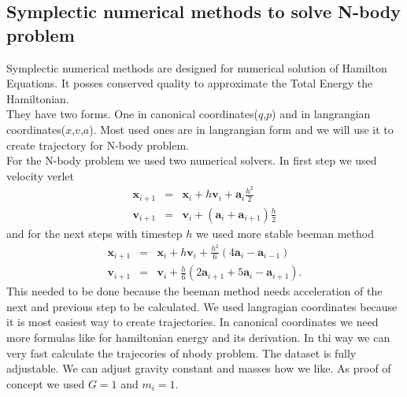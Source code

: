 \subsection{Symplectic numerical methods to solve N-body problem}
Symplectic numerical methods are designed for numerical solution of Hamilton Equations. It posses conserved quality to approximate the Total Energy the Hamiltonian.\\
They have two forms. One in canonical coordinates($q$,$p$) and in langrangian coordinates($x$,$v$,$a$). Most used ones are in langrangian form and we will use it to create trajectory for N-body problem.\\
For the N-body problem we used two numerical solvers. In first step we used velocity verlet
\begin{eqnarray}
	\mathbf{x}_{i+1} &=& \mathbf{x}_i + h\mathbf{v}_i + \mathbf{a}_i\frac{h^2}{2} \\
	\mathbf{v}_{i+1}&=&\mathbf{v}_i + (\mathbf{a}_i +\mathbf{a}_{i+1})\frac{h}{2}
\end{eqnarray} and
for the next steps with timestep $h$ we used more stable beeman method
\begin{eqnarray}
	\mathbf{x}_{i+1} &=& \mathbf{x}_i + h\mathbf{v}_i + \frac{h^2}{6}(4\mathbf{a}_{i}-\mathbf{a}_{i-1})\\
	\mathbf{v}_{i+1}&=&\mathbf{v}_i + \frac{h}{6}(2\mathbf{a}_{i+1} + 5\mathbf{a}_i-\mathbf{a}_{i+1}).
\end{eqnarray}
This needed to be done because the beeman method needs acceleration of the next and previous step to be calculated. We used langragian coordinates because it is most easiest way to create trajectories.
In canonical coordinates we need more formulas like for hamiltonian energy and its derivation. In thi way we can very fast calculate the trajecories of nbody problem. The dataset is fully adjustable. We can adjust gravity constant and masses how we like. As proof of concept we used $G=1$ and $m_i=1$.  
